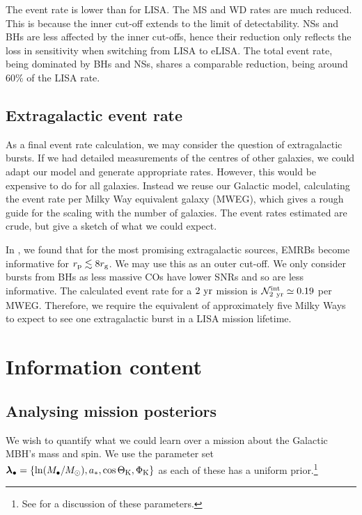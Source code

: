 The event rate is lower than for LISA. The MS and WD rates are much reduced. This is because the inner cut-off extends to the limit of detectability. NSs and BHs are less affected by the inner cut-offs, hence their reduction only reflects the loss in sensitivity when switching from LISA to eLISA. The total event rate, being dominated by BHs and NSs, shares a comparable reduction, being around $60\%$ of the LISA rate.

\subsection{Extragalactic event rate}\label{sec:extragal-events}

As a final event rate calculation, we may consider the question of extragalactic bursts. If we had detailed measurements of the centres of other galaxies, we could adapt our model and generate appropriate rates. However, this would be expensive to do for all galaxies. Instead we reuse our Galactic model, calculating the event rate per Milky Way equivalent galaxy (MWEG), which gives a rough guide for the scaling with the number of galaxies. The event rates estimated are crude, but give a sketch of what we could expect.

In , we found that for the most promising extragalactic sources, EMRBs become informative for $r_\mathrm{p} \lesssim 8 r_\mathrm{g}$. We may use this as an outer cut-off. We only consider bursts from BHs as less massive COs have lower SNRs and so are less informative. The calculated event rate for a $2~\mathrm{yr}$ mission is $\mathcal{N}_{2~\mathrm{yr}}^\mathrm{int} \simeq 0.19$ per MWEG. Therefore, we require the equivalent of approximately five Milky Ways to expect to see one extragalactic burst in a LISA mission lifetime.

\section{Information content}

\subsection{Analysing mission posteriors}

We wish to quantify what we could learn over a mission about the Galactic MBH's mass and spin. We use the parameter set $\boldsymbol{\lambda}_\bullet = \{\ln (M_\bullet/M_\odot), a_\ast, \cos \Theta_\mathrm{K}, \Phi_\mathrm{K}\}$ as each of these has a uniform prior.\footnote{See  for a discussion of these parameters.}

